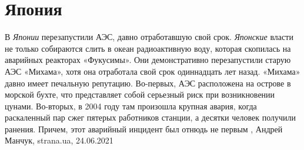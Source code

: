  
 
 
 
 
\chapter{Япония}
\label{sec:slova.japonia}

В \emph{Японии} перезапустили АЭС, давно отработавшую свой срок.
\emph{Японские} власти не только собираются слить в океан радиоактивную воду,
которая скопилась на аварийных реакторах «Фукусимы». Они демонстративно
перезапустили старую АЭС «Михама», хотя она отработала свой срок одиннадцать
лет назад.  «Михама» давно имеет печальную репутацию. Во-первых, АЭС
расположена на острове в морской бухте, что представляет собой серьезный риск
при возникновении цунами.  Во-вторых, в 2004 году там произошла крупная авария,
когда раскаленный пар сжег пятерых работников станции, а десятки человек
получили ранения. Причем, этот аварийный инцидент был отнюдь не первым
, 
Андрей Манчук, strana.ua, 24.06.2021
